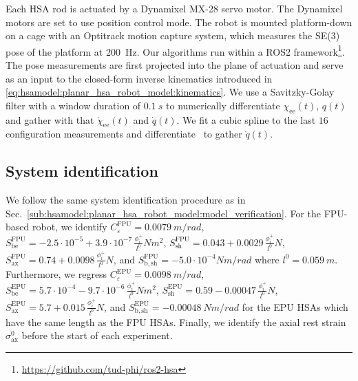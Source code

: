 Each \gls{HSA} rod is actuated by a Dynamixel MX-28 servo motor. The Dynamixel motors are set to use position control mode. %
The robot is mounted platform-down on a cage with an Optitrack motion capture system, which measures the SE(3) pose of the platform at \SI{200}{Hz}.
Our algorithms run within a ROS2 framework\footnote{\url{https://github.com/tud-phi/ros2-hsa}}. %
The pose measurements are first projected into the plane of actuation and serve as an input to the closed-form inverse kinematics introduced in \eqref{eq:hsamodel:planar_hsa_robot_model:kinematics}. 
We use a Savitzky-Golay filter with a window duration of $\SI{0.1}{s}$ to numerically differentiate $\chi_\mathrm{ee}(t)$, $q(t)$ and gather with that $\dot{\chi}_\mathrm{ee}(t)$ and $\dot{q}(t)$.
We fit a cubic spline to the last $16$ configuration measurements and differentiate~\cite{kaptanoglu2022pysindy} to gather $\dot{q}(t)$.


\subsection{System identification}
We follow the same system identification procedure as in Sec.~\ref{sub:hsamodel:planar_hsa_robot_model:model_verification}.
For the FPU-based robot, we identify $C_\varepsilon^\mathrm{FPU}=\SI{0.0079}{m \per rad}$, $S_\mathrm{be}^\mathrm{FPU} = -2.5 \cdot 10^{-5} + 3.9 \cdot 10^{-7} \, \frac{\phi_i^+}{l^0} \si{Nm^2}$, $S_\mathrm{sh}^\mathrm{FPU} = 0.043 + 0.0029 \, \frac{\phi_i^+}{l^0} \si{N}$, $S_\mathrm{ax}^\mathrm{FPU} = 0.74 + 0.0098 \, \frac{\phi_i^+}{l^0} \si{N}$, and $S_\mathrm{b,sh}^\mathrm{FPU} = -5.0 \cdot 10^{-4} \si{Nm \per rad}$ where $l^0 = \SI{0.059}{m}$. 
Furthermore, we regress $C_\varepsilon^\mathrm{EPU}=\SI{0.0098}{m \per rad}$, $S_\mathrm{be}^\mathrm{EPU} = 5.7 \cdot 10^{-4} -9.7 \cdot 10^{-6} \, \frac{\phi_i^+}{l^0} \si{Nm^2}$, $S_\mathrm{sh}^\mathrm{EPU} = 0.59 - 0.00047 \, \frac{\phi_i^+}{l^0} \si{N}$, $S_\mathrm{ax}^\mathrm{EPU} = 5.7 + 0.015 \, \frac{\phi_i^+}{l^0} \si{N}$, and $S_\mathrm{b,sh}^\mathrm{EPU} = -\SI{0.00048}{Nm \per rad}$ for the EPU \glspl{HSA} which have the same length as the FPU \glspl{HSA}.
Finally, we identify the axial rest strain $\sigma_\mathrm{ax}^0$ before the start of each experiment.

